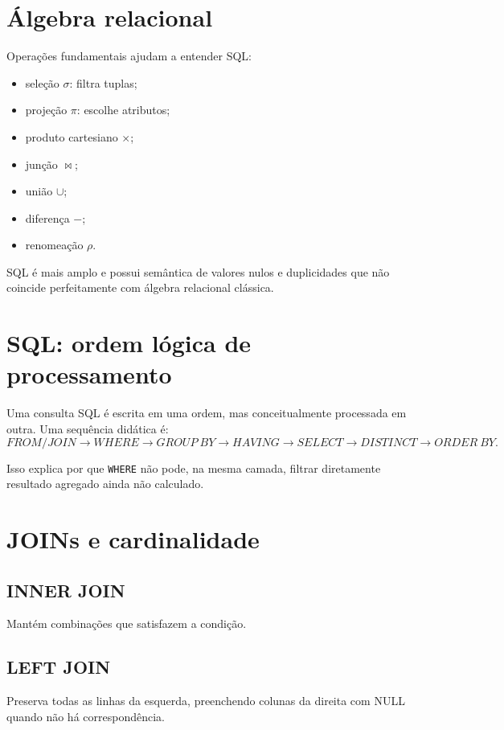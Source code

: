 \section{Álgebra relacional}

Operações fundamentais ajudam a entender SQL:
\begin{itemize}
\item seleção $\sigma$: filtra tuplas;
\item projeção $\pi$: escolhe atributos;
\item produto cartesiano $\times$;
\item junção $\bowtie$;
\item união $\cup$;
\item diferença $-$;
\item renomeação $\rho$.
\end{itemize}

SQL é mais amplo e possui semântica de valores nulos e duplicidades que não coincide perfeitamente com álgebra relacional clássica.

\section{SQL: ordem lógica de processamento}

Uma consulta SQL é escrita em uma ordem, mas conceitualmente processada em outra. Uma sequência didática é:
\[
FROM/JOIN\rightarrow WHERE\rightarrow GROUP\ BY\rightarrow HAVING\rightarrow SELECT\rightarrow DISTINCT\rightarrow ORDER\ BY.
\]

Isso explica por que \texttt{WHERE} não pode, na mesma camada, filtrar diretamente resultado agregado ainda não calculado.

\section{JOINs e cardinalidade}

\subsection{INNER JOIN}

Mantém combinações que satisfazem a condição.

\subsection{LEFT JOIN}

Preserva todas as linhas da esquerda, preenchendo colunas da direita com NULL quando não há correspondência.

